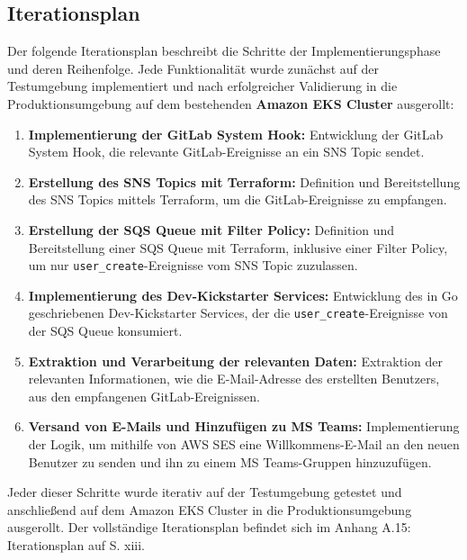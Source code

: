 \subsection{Iterationsplan}
\label{app:Iterationsplan}

Der folgende Iterationsplan beschreibt die Schritte der Implementierungsphase und deren Reihenfolge. Jede Funktionalität wurde zunächst auf der Testumgebung implementiert und nach erfolgreicher Validierung in die Produktionsumgebung auf dem bestehenden \textbf{Amazon EKS Cluster} ausgerollt:

\begin{enumerate}
    \item \textbf{Implementierung der GitLab System Hook:} Entwicklung der GitLab System Hook, die relevante GitLab-Ereignisse an ein SNS Topic sendet.
    
    \item \textbf{Erstellung des SNS Topics mit Terraform:} Definition und Bereitstellung des SNS Topics mittels Terraform, um die GitLab-Ereignisse zu empfangen.
    
    \item \textbf{Erstellung der SQS Queue mit Filter Policy:} Definition und Bereitstellung einer SQS Queue mit Terraform, inklusive einer Filter Policy, um nur \texttt{user\_create}-Ereignisse vom SNS Topic zuzulassen.
    
    \item \textbf{Implementierung des Dev-Kickstarter Services:} Entwicklung des in Go geschriebenen Dev-Kickstarter Services, der die \texttt{user\_create}-Ereignisse von der SQS Queue konsumiert.
    
    \item \textbf{Extraktion und Verarbeitung der relevanten Daten:} Extraktion der relevanten Informationen, wie die E-Mail-Adresse des erstellten Benutzers, aus den empfangenen GitLab-Ereignissen.
    
    \item \textbf{Versand von E-Mails und Hinzufügen zu MS Teams:} Implementierung der Logik, um mithilfe von AWS SES eine Willkommens-E-Mail an den neuen Benutzer zu senden und ihn zu einem MS Teams-Gruppen hinzuzufügen.
\end{enumerate}

Jeder dieser Schritte wurde iterativ auf der Testumgebung getestet und anschließend auf dem Amazon EKS Cluster in die Produktionsumgebung ausgerollt. Der vollständige Iterationsplan befindet sich im Anhang A.15: Iterationsplan auf S. xiii.
